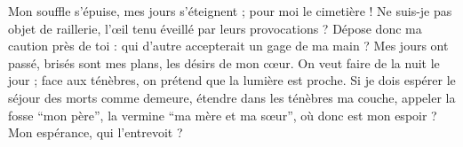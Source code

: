 Mon souffle s’épuise, mes jours s’éteignent ; pour moi le cimetière !
Ne suis-je pas objet de raillerie, l’œil tenu éveillé par leurs provocations ?
Dépose donc ma caution près de toi : qui d’autre accepterait un gage de ma main ?
Mes jours ont passé, brisés sont mes plans, les désirs de mon cœur.
On veut faire de la nuit le jour ; face aux ténèbres, on prétend que la lumière est proche.
Si je dois espérer le séjour des morts comme demeure, étendre dans les ténèbres ma couche, 
appeler la fosse “mon père”, la vermine “ma mère et ma sœur”,
où donc est mon espoir ? Mon espérance, qui l’entrevoit ?